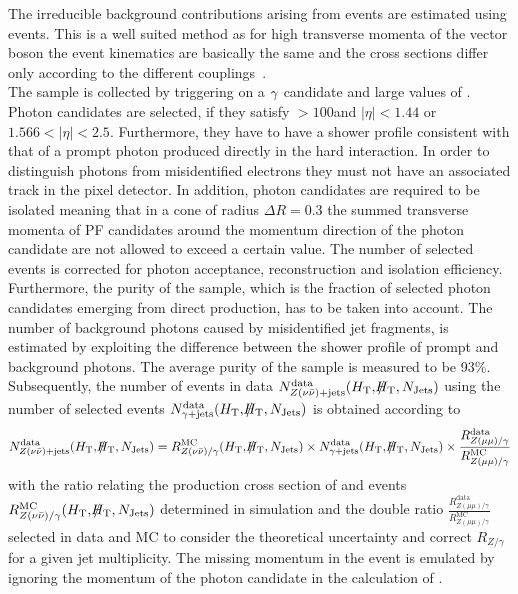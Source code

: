 The irreducible background contributions arising from \ZInvJets events are estimated using \photonJets events. This is a well suited method as for high transverse momenta of the vector boson the event kinematics are basically the same and the cross sections differ only according to the different couplings~\cite{Ask:2011xf, Bern:2012vx}. \\
The \photonJets sample is collected by triggering on a $\gamma$ candidate and large values of \HT. Photon candidates are selected, if they satisfy \pt$ > 100$\gev and $|\eta| < 1.44$ or $1.566 < |\eta| < 2.5$. Furthermore, they have to have a shower profile consistent with that of a prompt photon produced directly in the hard interaction. In order to distinguish photons from misidentified electrons they must not have an associated track in the pixel detector. In addition, photon candidates are required to be isolated meaning that in a cone of radius $\Delta R = 0.3$ the summed transverse momenta of PF candidates around the momentum direction of the photon candidate are not allowed to exceed a certain value. The number of selected \photonJets events is corrected for photon acceptance, reconstruction and isolation efficiency. Furthermore, the purity of the \photonJets sample, which is the fraction of selected photon candidates emerging from direct production, has to be taken into account. The number of background photons caused \eg by misidentified jet fragments, is estimated by exploiting the difference between the shower profile of prompt and background photons. The average purity of the \photonJets sample is measured to be 93\%.\\
Subsequently, the number of \ZInvJets events in data $N_{Z(\nu\bar{\nu})+\text{jets}}^{\text{data}} (H_{\text{T}}, \slash\mkern-12mu{H}_{\text{T}}, N_{\text{Jets}})$ using the number of selected \photonJets events $N_{\gamma+\text{jets}}^{\text{data}} (H_{\text{T}},\slash\mkern-12mu{H}_{\text{T}},N_{\text{Jets}})$ is obtained according to
\begin{equation*}
N_{\ZInvJets}^{\text{data}} (\HT, \MHT, \NJets) = R^{\text{MC}}_{Z(\nu\bar{\nu})/\gamma} (\HT,\MHT,\NJets)
                                                        \times 
                                                       N_{\photonJets}^{\text{data}} (\HT,\MHT,\NJets)
                                                       \times 
                                                       \frac{R_{Z(\mu\mu)/\gamma}^{\text{data}}}{R_{Z(\mu\mu)/\gamma}^{\text{MC}}}
\label{eqn:photoncorr}
\end{equation*}
with the ratio relating the production cross section of \ZInvJets and \photonJets events $R^{\text{MC}}_{Z(\nu\bar{\nu})/\gamma} (H_{\text{T}},\slash\mkern-12mu{H}_{\text{T}},N_{\text{Jets}})$ determined in simulation and the double ratio $\frac{R_{Z(\mu\mu)/\gamma}^{\text{data}}}{R_{Z(\mu\mu)/\gamma}^{\text{MC}}}$ selected in data and MC to consider the theoretical uncertainty and correct $R_{Z/\gamma}$ for a given jet multiplicity. The missing momentum in the event is emulated by ignoring the momentum of the photon candidate in the calculation of \MHT. \\

